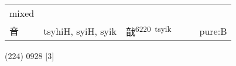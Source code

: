 \documentclass[14pt,a4paper]{scrartcl}
\begin{document}
\begin{longtable}[c]{@{}llllll@{}}
\begin{minipage}[t]{0.14\columnwidth}
mixed
\strut\end{minipage}\tabularnewline
\begin{minipage}[t]{0.14\columnwidth}\raggedright\strut
音
\strut\end{minipage} &
\begin{minipage}[t]{0.14\columnwidth}\raggedright\strut
tsyhiH, syiH, syik
\strut\end{minipage} &
\begin{minipage}[t]{0.14\columnwidth}\raggedright\strut
戠\textsuperscript{6220~tsyik}
\strut\end{minipage} &
\begin{minipage}[t]{0.14\columnwidth}\raggedright\strut
\strut\end{minipage} &
\begin{minipage}[t]{0.14\columnwidth}\raggedright\strut
\strut\end{minipage} &
\begin{minipage}[t]{0.14\columnwidth}\raggedright\strut
pure:B
\strut\end{minipage}\tabularnewline
\bottomrule
\end{longtable}

(224) 0928 {[}3{]}
\end{document}
